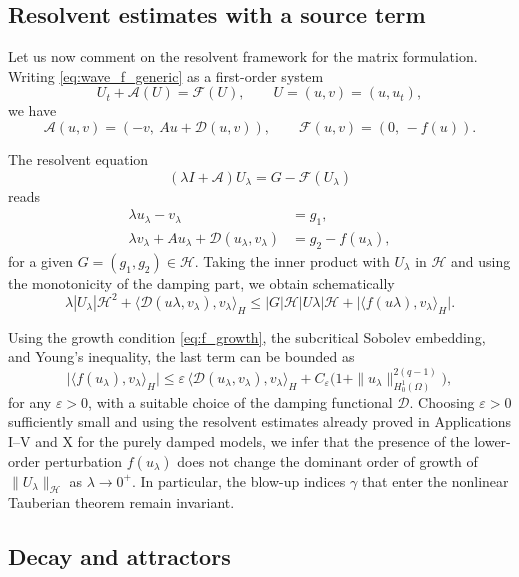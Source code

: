 \documentclass[11pt,reqno]{amsart}
\theoremstyle{remark}
\begin{document}
    \subsection{Resolvent estimates with a source term}

    Let us now comment on the resolvent framework for the matrix formulation. Writing \eqref{eq:wave_f_generic} as a first-order system$$U_t + \mathcal{A}(U) = \mathcal{F}(U), \qquad U=(u,v)=(u,u_t),$$
    we have
    $$\mathcal{A}(u,v)=(-v,\ Au+\mathcal{D}(u,v)), \qquad \mathcal{F}(u,v)=(0,\,-f(u)).$$

    The resolvent equation
    $$(\lambda I + \mathcal{A})U_\lambda = G - \mathcal{F}(U_\lambda)$$
    reads
    \begin{align*}\lambda u_\lambda - v_\lambda &= g_1,\\
    \lambda v_\lambda + Au_\lambda + \mathcal{D}(u_\lambda,v_\lambda) &= g_2 - f(u_\lambda),
    \end{align*}
    for a given $G=(g_1,g_2)\in\mathcal{H}$. Taking the inner product with $U_\lambda$ in $\mathcal{H}$ and using the monotonicity of the damping part, we obtain schematically
    \begin{equation}\label{eq:resolvent_f_basic}
    \lambda|U_\lambda|{\mathcal{H}}^2 + \bigl\langle \mathcal{D}(u\lambda,v_\lambda),v_\lambda\bigr\rangle_H \le |G|{\mathcal{H}}|U\lambda|{\mathcal{H}} + \bigl|\langle f(u\lambda),v_\lambda\rangle_H\bigr|.
    \end{equation}

    Using the growth condition \eqref{eq:f_growth}, the subcritical Sobolev embedding, and Young's inequality, the last term can be bounded as
    $$\bigl|\langle f(u_\lambda),v_\lambda\rangle_H\bigr| \le \varepsilon\,\bigl\langle \mathcal{D}(u_\lambda,v_\lambda),v_\lambda\bigr\rangle_H + C_\varepsilon\bigl(1+\|u_\lambda\|_{H_0^1(\Omega)}^{2(q-1)}\bigr),$$
    for any $\varepsilon>0$, with a suitable choice of the damping functional $\mathcal{D}$. Choosing $\varepsilon>0$ sufficiently small and using the resolvent estimates already proved in Applications I--V and X for the purely damped models, we infer that the presence of the lower-order perturbation $f(u_\lambda)$ does not change the dominant order of growth of $\|U_\lambda\|_{\mathcal{H}}$ as $\lambda\to 0^+$. In particular, the blow-up indices $\gamma$ that enter the nonlinear Tauberian theorem remain invariant.

    \subsection{Decay and attractors}
\end{document}
